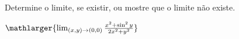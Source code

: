 Determine o limite, se existir, ou mostre que o limite não existe.

$\mathlarger{\lim_{(x,y)\rightarrow(0,0)} \frac{x^2+\sin^2 y}{2x^2+y^2}}$
